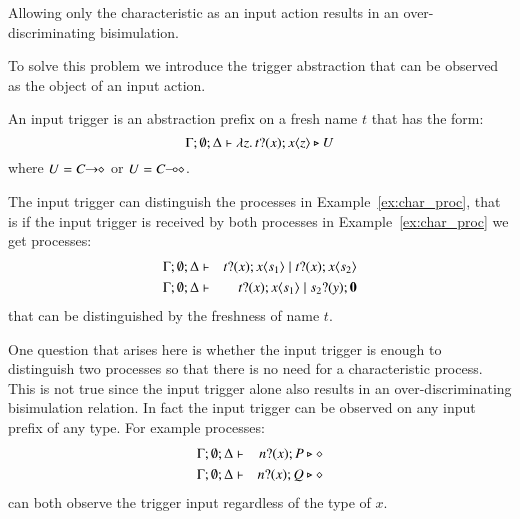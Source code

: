 Allowing only the characteristic as an input action
results in an over-discriminating bisimulation.

To solve this problem we introduce the trigger abstraction
that can be observed as the object of an input action.

An input trigger is an abstraction prefix on a fresh name $t$
that has the form:
\[
	\Gamma; \emptyset; \Delta \vdash \lambda z.\,t ? (x) ; x\langle z \rangle \triangleright U
\]
where $U = C\!\! \rightarrow\!\! \diamond$ or $U = C\!\! \multimap\!\! \diamond$.

The input trigger can distinguish the processes in Example~\ref{ex:char_proc},
that is if the input trigger is received by both processes in Example~\ref{ex:char_proc}
we get processes:
%
\begin{eqnarray*}
	\Gamma; \emptyset; \Delta &\vdash& t ? (x) ; x\langle s_1 \rangle \;|\; t ? (x) ; x\langle s_2 \rangle
	\\
	\Gamma; \emptyset; \Delta &\vdash& t ? (x) ; x\langle s_1 \rangle \;|\; s_2 ? (y) ; \mathbf{0}
\end{eqnarray*}
\noi that can be distinguished by the freshness of name $t$.

One question that arises here is whether the input trigger is enough
to distinguish two processes so that there is no need for a
characteristic process. This is not true since the input trigger
alone also results in an over-discriminating bisimulation relation.
In fact the input trigger can be observed on any input prefix
of any type. For example processes:
%
\begin{eqnarray*}
	\Gamma; \emptyset; \Delta &\vdash& n ? (x) ; P \triangleright \diamond
	\\
	\Gamma; \emptyset; \Delta &\vdash& n ? (x) ; Q \triangleright \diamond
\end{eqnarray*}
%
\noi can both observe the trigger input regardless of the type of $x$.

